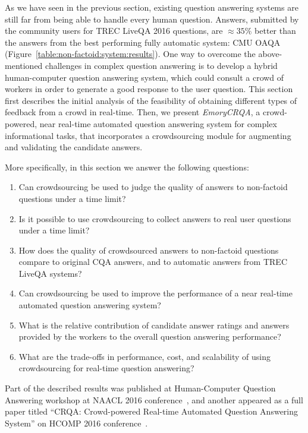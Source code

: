As we have seen in the previous section, existing question answering systems are still far from being able to handle every human question.
Answers, submitted by the community users for TREC LiveQA 2016 questions, are $\approx 35\%$ better than the answers from the best performing fully automatic system: CMU OAQA (Figure~\ref{table:non-factoid:system:results}).
One way to overcome the above-mentioned challenges in complex question answering is to develop a hybrid human-computer question answering system, which could consult a crowd of workers in order to generate a good response to the user question.
This section first describes the initial analysis of the feasibility of obtaining different types of feedback from a crowd in real-time.
Then, we present \textit{EmoryCRQA}, a crowd-powered, near real-time automated question answering system for complex informational tasks, that incorporates a crowdsourcing module for augmenting and validating the candidate answers.

More specifically, in this section we answer the following questions:
\begin{enumerate}[itemsep=0em]
\item Can crowdsourcing be used to judge the quality of answers to non-factoid questions under a time limit?
\item Is it possible to use crowdsourcing to collect answers to real user questions under a time limit?
\item How does the quality of crowdsourced answers to non-factoid questions compare to original CQA answers, and to automatic answers from TREC LiveQA systems?
\item Can crowdsourcing be used to improve the performance of a near real-time automated question answering system?
\item What is the relative contribution of candidate answer ratings and answers provided by the workers to the overall question answering performance?
\item What are the trade-offs in performance, cost, and scalability of using crowdsourcing for real-time question answering?
\end{enumerate}

Part of the described results was published at Human-Computer Question Answering workshop at NAACL 2016 conference~\cite{savenkov_crowdsourcing2016a}, and another appeared as a full paper titled ``CRQA: Crowd-powered Real-time Automated Question Answering System'' on HCOMP 2016 conference~\cite{savenkov_crqa2016}.

